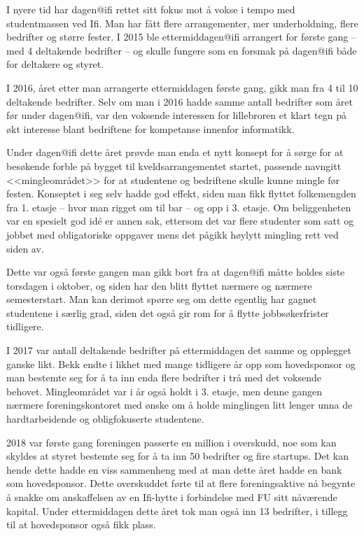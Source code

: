 \author{Skrevet av Karl H. Totland}

I nyere tid har dagen@ifi rettet sitt fokus mot å vokse i tempo med studentmassen ved Ifi. Man har fått flere arrangementer, mer underholdning, flere bedrifter og større fester. I 2015 ble ettermiddagen@ifi arrangert for første gang -- med 4 deltakende bedrifter -- og skulle fungere som en forsmak på dagen@ifi både for deltakere og styret.

I 2016, året etter man arrangerte ettermiddagen første gang, gikk man fra 4 til 10 deltakende bedrifter. Selv om man i 2016 hadde samme antall bedrifter som året før under dagen@ifi, var den voksende interessen for lillebroren et klart tegn på økt interesse blant bedriftene for kompetanse innenfor informatikk.

Under dagen@ifi dette året prøvde man enda et nytt konsept for å sørge for at besøkende forble på bygget til kveldsarrangementet startet, passende navngitt <<mingleområdet>> for at studentene og bedriftene skulle kunne mingle før festen. Konseptet i seg selv hadde god effekt, siden man fikk flyttet folkemengden fra 1. etasje -- hvor man rigget om til bar -- og opp i 3. etasje. Om beliggenheten var en spesielt god idé er annen sak, ettersom det var flere studenter som satt og jobbet med obligatoriske oppgaver mens det pågikk høylytt mingling rett ved siden av.

Dette var også første gangen man gikk bort fra at dagen@ifi måtte holdes siste torsdagen i oktober, og siden har den blitt flyttet nærmere og nærmere semesterstart. Man kan derimot spørre seg om dette egentlig har gagnet studentene i særlig grad, siden det også gir rom for å flytte jobbsøkerfrister tidligere.

I 2017 var antall deltakende bedrifter på ettermiddagen det samme og opplegget ganske likt. Bekk endte i likhet med mange tidligere år opp som hovedsponsor og man bestemte seg for å ta inn enda flere bedrifter i trå med det voksende behovet. Mingleområdet var i år også holdt i 3. etasje, men denne gangen nærmere foreningskontoret med ønske om å holde minglingen litt lenger unna de hardtarbeidende og obligfokuserte studentene.

2018 var første gang foreningen passerte en million i overskudd, noe som kan skyldes at styret bestemte seg for å ta inn 50 bedrifter og fire startups. Det kan hende dette hadde en viss sammenheng med at man dette året hadde en bank som hovedsponsor. Dette overskuddet førte til at flere foreningsaktive nå begynte å snakke om anskaffelsen av en Ifi-hytte i forbindelse med FU sitt nåværende kapital. Under ettermiddagen dette året tok man også inn 13 bedrifter, i tillegg til at hovedsponsor også fikk plass.

